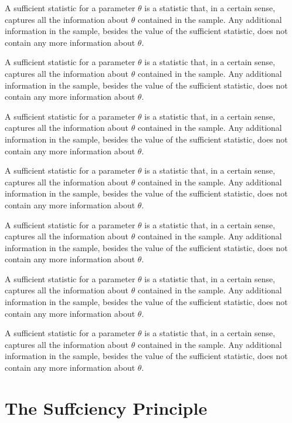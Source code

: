 A sufficient statistic for a parameter $\theta$ is a statistic that, in a certain sense, captures all the information about $\theta$ contained in the sample. Any additional information in the sample, besides the value of the sufficient statistic, does not contain any more information about $\theta$.

A sufficient statistic for a parameter $\theta$ is a statistic that, in a certain sense, captures all the information about $\theta$ contained in the sample. Any additional information in the sample, besides the value of the sufficient statistic, does not contain any more information about $\theta$.

A sufficient statistic for a parameter $\theta$ is a statistic that, in a certain sense, captures all the information about $\theta$ contained in the sample. Any additional information in the sample, besides the value of the sufficient statistic, does not contain any more information about $\theta$.

A sufficient statistic for a parameter $\theta$ is a statistic that, in a certain sense, captures all the information about $\theta$ contained in the sample. Any additional information in the sample, besides the value of the sufficient statistic, does not contain any more information about $\theta$.

A sufficient statistic for a parameter $\theta$ is a statistic that, in a certain sense, captures all the information about $\theta$ contained in the sample. Any additional information in the sample, besides the value of the sufficient statistic, does not contain any more information about $\theta$.

A sufficient statistic for a parameter $\theta$ is a statistic that, in a certain sense, captures all the information about $\theta$ contained in the sample. Any additional information in the sample, besides the value of the sufficient statistic, does not contain any more information about $\theta$.

A sufficient statistic for a parameter $\theta$ is a statistic that, in a certain sense, captures all the information about $\theta$ contained in the sample. Any additional information in the sample, besides the value of the sufficient statistic, does not contain any more information about $\theta$.

\section{The Suffciency Principle}


